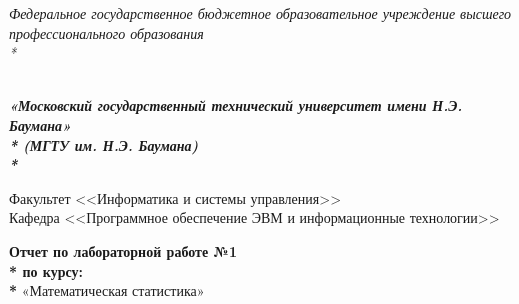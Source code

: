 \newpage
\begin{titlepage}
	\thispagestyle{empty}
	
	{\large
		\begin{center}
			\textsl{Федеральное государственное бюджетное образовательное учреждение высшего профессионального образования \\* }	
			\vspace{2em}
		\end{center}
	}
	{
		\begin{minipage}[t]{0.13\textwidth}
			\centering{}
			\label{fig0}
		\end{minipage}\hfill
		\begin{minipage}[t]{0.65\textwidth}
			\begin{center}
				\large  \textsl{\textbf {\\ «Московский государственный технический университет имени Н.Э. Баумана» \\* (МГТУ им. Н.Э. Баумана) \\* }}
			\end{center}
		\end{minipage}
	}
	
	\vspace{2em}
	
	\hrulefill
	
	\begin{center}
		\vspace{0pt plus2fill} %
		{\large
			Факультет  <<Информатика и системы управления>>\\
			Кафедра  <<Программное обеспечение ЭВМ и информационные технологии>>
		}
	\end{center}
	
	{\Large
		\begin{center}
			\textbf{Отчет по лабораторной работе №1 \\* по курсу: \\* } «Математическая статистика» \\
		\end{center}
	}
	\vspace{0pt plus4fill} %
	

\end{titlepage}
